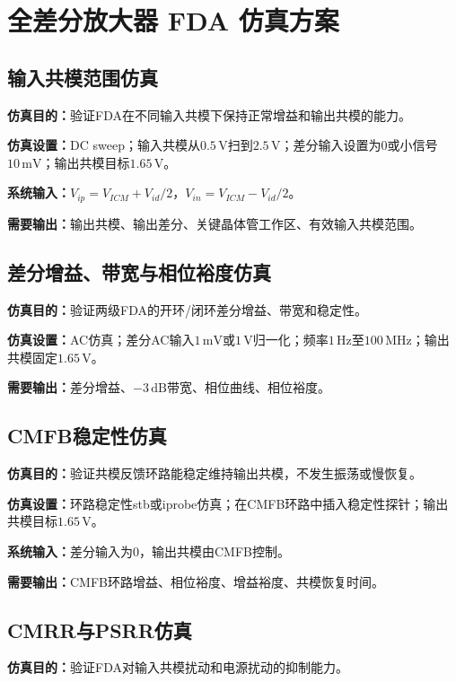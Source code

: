 \documentclass[12pt,a4paper]{ctexart}
\begin{document}
\section{全差分放大器 FDA 仿真方案}

\subsection{输入共模范围仿真}

\textbf{仿真目的：}验证FDA在不同输入共模下保持正常增益和输出共模的能力。

\textbf{仿真设置：}DC sweep；输入共模从$0.5\,\mathrm{V}$扫到$2.5\,\mathrm{V}$；差分输入设置为$0$或小信号$10\,\mathrm{mV}$；输出共模目标$1.65\,\mathrm{V}$。

\textbf{系统输入：}$V_{ip}=V_{ICM}+V_{id}/2$，$V_{in}=V_{ICM}-V_{id}/2$。

\textbf{需要输出：}输出共模、输出差分、关键晶体管工作区、有效输入共模范围。

\subsection{差分增益、带宽与相位裕度仿真}

\textbf{仿真目的：}验证两级FDA的开环/闭环差分增益、带宽和稳定性。

\textbf{仿真设置：}AC仿真；差分AC输入$1\,\mathrm{mV}$或$1\,\mathrm{V}$归一化；频率$1\,\mathrm{Hz}$至$100\,\mathrm{MHz}$；输出共模固定$1.65\,\mathrm{V}$。

\textbf{需要输出：}差分增益、$-3\,\mathrm{dB}$带宽、相位曲线、相位裕度。

\subsection{CMFB稳定性仿真}

\textbf{仿真目的：}验证共模反馈环路能稳定维持输出共模，不发生振荡或慢恢复。

\textbf{仿真设置：}环路稳定性stb或iprobe仿真；在CMFB环路中插入稳定性探针；输出共模目标$1.65\,\mathrm{V}$。

\textbf{系统输入：}差分输入为0，输出共模由CMFB控制。

\textbf{需要输出：}CMFB环路增益、相位裕度、增益裕度、共模恢复时间。

\subsection{CMRR与PSRR仿真}

\textbf{仿真目的：}验证FDA对输入共模扰动和电源扰动的抑制能力。
\end{document}
